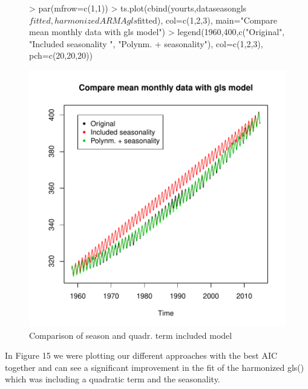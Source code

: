 \documentclass[10pt, a4paper]{article} %
\begin{document}
\begin{figure}[H]
\centering
\begin{Schunk}
\begin{Sinput}
> par(mfrow=c(1,1))
> ts.plot(cbind(yourts,dataseasongls$fitted, harmonizedARMAgls$fitted),
         col=c(1,2,3),
         main="Compare mean monthly data with gls model")
> legend(1960,400,c("Original", "Included seasonality ",
                   "Polynm. + seasonality"),
         col=c(1,2,3), pch=c(20,20,20))
\end{Sinput}
\end{Schunk}
\includegraphics{FINAL_VERSION-050}
\caption{Comparison of season and quadr. term included model}
\label{compq}
\end{figure}

\linebreak
In Figure 15 we were plotting our different approaches with the best AIC together and can see a significant improvement in the fit of the harmonized gls() which was including a quadratic term and the seasonality. \\
\end{document}
